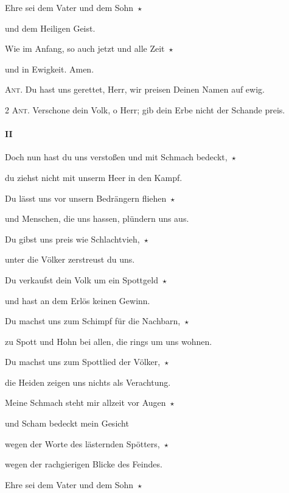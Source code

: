 \noindent Ehre sei dem Vater und dem Sohn~$\star$~\nopagebreak

und dem Heiligen Geist.

\noindent Wie im Anfang, so auch jetzt und alle Zeit~$\star$~\nopagebreak

und in Ewigkeit. Amen.

\vspace{10pt}

\noindent \textsc{Ant.} Du hast uns gerettet, Herr, wir preisen Deinen Namen auf ewig. \vspace{10pt}

\noindent \textsc{2 Ant.} Verschone dein Volk, o Herr; gib dein Erbe nicht der Schande preis. \nopagebreak

\paragraph{II}

\noindent Doch nun hast du uns verstoßen und mit Schmach bedeckt,~$\star$~\nopagebreak

du ziehst nicht mit unserm Heer in den Kampf. 

 \noindent Du lässt uns vor unsern Bedrängern fliehen~$\star$~\nopagebreak

und Menschen, die uns hassen, plündern uns aus. 

 \noindent Du gibst uns preis wie Schlachtvieh,~$\star$~\nopagebreak

unter die Völker zerstreust du uns. 

 \noindent Du verkaufst dein Volk um ein Spottgeld~$\star$~\nopagebreak

und hast an dem Erlös keinen Gewinn. 

 \noindent Du machst uns zum Schimpf für die Nachbarn,~$\star$~\nopagebreak

zu Spott und Hohn bei allen, die rings um uns wohnen.

\noindent Du machst uns zum Spottlied der Völker,~$\star$~\nopagebreak

die Heiden zeigen uns nichts als Verachtung.

\noindent Meine Schmach steht mir allzeit vor Augen~$\star$~\nopagebreak

und Scham bedeckt mein Gesicht

\noindent wegen der Worte des lästernden Spötters,~$\star$~\nopagebreak

wegen der rachgierigen Blicke des Feindes.

\noindent Ehre sei dem Vater und dem Sohn~$\star$~\nopagebreak

